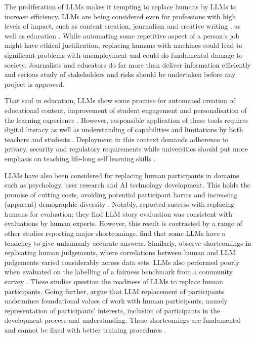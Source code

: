 \noindent The proliferation of LLMs makes it tempting to replace humans by LLMs to increase efficiency. LLMs are being considered even for professions with high levels of impact, such as content creation, journalism and creative writing \cite{wga_negotiating_comittee_wga_2023}, as well as education \cite{walczak2023challenges, kasneci2023chatgpt, sok2023chatgpt}. While automating some repetitive aspect of a person's job might have ethical justification, replacing humans with machines could lead to significant problems with unemployment and could do fundamental damage to society. Journalists and educators do far more than deliver information efficiently and serious study of stakeholders and risks should be undertaken before any project is approved.   

That said in education, LLMs show some promise for automated creation of educational content, improvement of student engagement and personalisation of the learning experience \cite{kasneci2023chatgpt}. However, responsible application of these tools requires digital literacy as well as understanding of capabilities and limitations by both teachers and students \cite{walczak2023challenges, kasneci2023chatgpt}. Deployment in this context demands adherence to privacy, security and regulatory requirements \cite{kasneci2023chatgpt} while universities should put more emphasis on teaching life-long self learning skills \cite{walczak2023challenges}.

LLMs have also been considered for replacing human participants in domains such as psychology, user research and AI technology development. This holds the promise of cutting costs, avoiding potential participant harms and increasing (apparent) demographic diversity \cite{agnew_illusion_2024}.
Notably, \citet{chiang_can_2023} reported success with replacing humans for evaluation; they find LLM story evaluation was consistent with evaluations by human experts.
However, this result is contrasted by a range of other studies reporting major shortcomings.
\citet{aher_using_2022} find that some LLMs have a tendency to give unhumanly accurate answers. Similarly, \citet{bavaresco_llms_2024} observe shortcomings in replicating human judgements, where correlations between human and LLM judgements varied considerably across data sets.
LLMs also performed poorly when evaluated on the labelling of a fairness benchmark from a community survey \cite{felkner_gpt_2024}.
These studies question the readiness of LLMs to replace human participants. Going further, \citet{agnew_illusion_2024} argue that LLM replacement of participants undermines foundational values of work with human participants, namely representation of participants' interests, inclusion of participants in the development process and understanding. These shortcomings are fundamental and cannot be fixed with better training procedures \cite{agnew_illusion_2024}.

